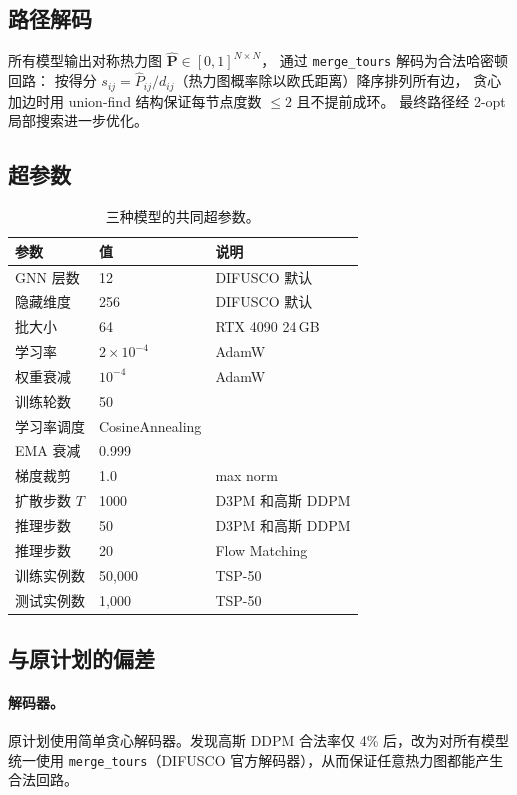 \documentclass[11pt,a4paper]{article}
\begin{document}
\subsection{路径解码}
\label{sec:decoding_zh}
所有模型输出对称热力图 $\hat{\mathbf{P}} \in [0,1]^{N\times N}$，
通过 \texttt{merge\_tours} \citep{sun2023difusco} 解码为合法哈密顿回路：
按得分 $s_{ij} = \hat{P}_{ij} / d_{ij}$（热力图概率除以欧氏距离）降序排列所有边，
贪心加边时用 union-find 结构保证每节点度数 $\le 2$ 且不提前成环。
最终路径经 2-opt 局部搜索进一步优化。

\subsection{超参数}
\begin{table}[h]
\centering
\caption{三种模型的共同超参数。}
\label{tab:hyperparams_zh}
\begin{tabular}{lll}
\toprule
参数 & 值 & 说明 \\
\midrule
GNN 层数 & 12 & DIFUSCO 默认 \\
隐藏维度 & 256 & DIFUSCO 默认 \\
批大小 & 64 & RTX 4090 24\,GB \\
学习率 & $2\times10^{-4}$ & AdamW \\
权重衰减 & $10^{-4}$ & AdamW \\
训练轮数 & 50 & \\
学习率调度 & CosineAnnealing & \\
EMA 衰减 & 0.999 & \\
梯度裁剪 & 1.0 & max norm \\
扩散步数 $T$ & 1000 & D3PM 和高斯 DDPM \\
推理步数 & 50 & D3PM 和高斯 DDPM \\
推理步数 & 20 & Flow Matching \\
训练实例数 & 50{,}000 & TSP-50 \\
测试实例数 & 1{,}000 & TSP-50 \\
\bottomrule
\end{tabular}
\end{table}

\subsection{与原计划的偏差}
\label{sec:deviations_zh}

\paragraph{解码器。}
原计划使用简单贪心解码器。发现高斯 DDPM 合法率仅 4\% 后，改为对所有模型统一使用
\texttt{merge\_tours}（DIFUSCO 官方解码器），从而保证任意热力图都能产生合法回路。
\end{document}
